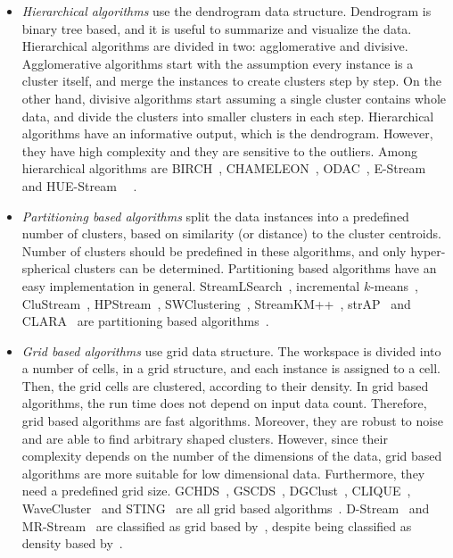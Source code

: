 \documentclass[smallcondensed]{svjour3}     %
\begin{document}
\begin{itemize}
	\item \textit{Hierarchical algorithms} use the dendrogram data structure. Dendrogram is binary tree based, and it is useful to summarize and visualize the data. Hierarchical algorithms are divided in two: agglomerative and divisive. Agglomerative algorithms start with the assumption every instance is a cluster itself, and merge the instances to create clusters step by step. On the other hand, divisive algorithms start assuming a single cluster contains whole data, and divide the clusters into smaller clusters in each step. Hierarchical algorithms have an informative output, which is the dendrogram. However, they have high complexity and they are sensitive to the outliers. Among hierarchical algorithms are BIRCH~\citep{Zhang:1996:Birch}, CHAMELEON~\citep{Karypis:1999:CHAMELEON}, ODAC~\citep{Rodrigues:2006:ODAC}, E-Stream~\citep{2007:E-Stream} and HUE-Stream~\citep{2011:HUE-Stream} ~\citep{Mousavi:2015:review,Kumar:2016:review}. 
	\item \textit{Partitioning based algorithms} split the data instances into a predefined number of clusters, based on similarity (or distance) to the cluster centroids. Number of clusters should be predefined in these algorithms, and only hyper-spherical clusters can be determined. Partitioning based algorithms have an easy implementation in general. StreamLSearch~\citep{Callagha:2002:LSearch}, incremental $k$-means~\citep{2003:incrementalkmeans}, CluStream~\citep{Aggarwal:2003:Clustream}, HPStream~\citep{2004:hpstream}, SWClustering~\citep{Zhou:2008:swclustering}, StreamKM++~\citep{Ackermann:2012:streamKM++}, strAP~\citep{2014:strAP} and CLARA~\citep{2008:clara} are partitioning based algorithms~\citep{Mousavi:2015:review,Kumar:2016:review,Ghesmoune:2016:review}. 
	\item \textit{Grid based algorithms} use grid data structure. The workspace is divided into a number of cells, in a grid structure, and each instance is assigned to a cell. Then, the grid cells are clustered, according to their density. In grid based algorithms, the run time does not depend on input data count. Therefore, grid based algorithms are fast algorithms. Moreover, they are robust to noise and are able to find arbitrary shaped clusters. However, since their complexity depends on the number of the dimensions of the data, grid based algorithms are more suitable for low dimensional data. Furthermore, they need a predefined grid size. GCHDS~\citep{2005:gchds}, GSCDS~\citep{2006:gscds}, DGClust~\citep{Gama:2011:DGClust}, CLIQUE~\citep{1998:clique}, WaveCluster~\citep{2000:WaveCluster} and STING~\citep{1997:STING} are all grid based algorithms~\citep{Mousavi:2015:review}. D-Stream~\citep{Chen:2007:D-Stream} and MR-Stream~\citep{2009:mr-stream} are classified as grid based by~\citet{Ghesmoune:2016:review}, despite being classified as density based by~\citet{Mousavi:2015:review}. 

\end{itemize}
\end{document}
